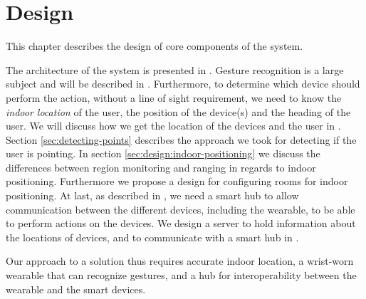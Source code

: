 \chapter{Design}\label{chap:design}

This chapter describes the design of core components of the system.

The architecture of the system is presented in .
Gesture recognition is a large subject and will be described in . 
Furthermore, to determine which device should perform the action, 
without a line of sight requirement, 
we need to know the \emph{indoor location} of the user, 
the position of the device(s) and the heading of the user. 
We will discuss how we get the location of the devices and the user in .
Section \ref{sec:detecting-points} describes the approach we took for detecting if the user is pointing.
In section \ref{sec:design:indoor-positioning} we discuss the differences between region monitoring and ranging in regards to indoor positioning. Furthermore we propose a design for configuring rooms for indoor positioning.
At last, as described in , 
we need a smart hub to allow communication between the different devices, 
including the wearable, to be able to perform actions on the devices. 
We design a server to hold information about the locations of devices,
and to communicate with a smart hub in . 

Our approach to a solution thus requires accurate indoor location, 
a wrist-worn wearable that can recognize gestures, 
and a hub for interoperability between the wearable and the smart devices. 








